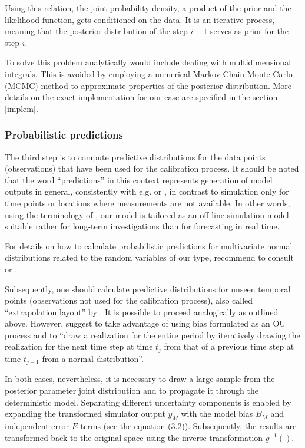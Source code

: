 \documentclass{ctuthesis}\usepackage[]{graphicx}\usepackage[]{color}
\begin{document}
Using this relation, the joint probability density, a product of the prior and the likelihood function, gets conditioned on the data. It is an iterative process, meaning that the posterior distribution of the step $i-1$ serves as prior for the step $i$.

To solve this problem analytically would include dealing with multidimensional integrals. This is avoided by employing a numerical Markov Chain Monte Carlo (MCMC) method to approximate properties of the posterior distribution. More details on the exact implementation for our case are specified in the section \ref{implem}.



\subsubsection{Probabilistic predictions}
The third step is to compute predictive distributions for the data points (observations) that have been used for the calibration process. It should be noted that the word \enquote{predictions} in this context represents  generation of model outputs in general, consistently with e.g. \cite{reichert2012linking} or \cite{giudice2013improving}, in contrast to simulation only for time points or locations where measurements are not available. In other words, using the terminology of \cite{breinholt2012formal}, our model is tailored as an off-line simulation model suitable rather for long-term investigations than for forecasting in  real time.

For details on how to calculate probabilistic predictions for multivariate normal distributions related to the random variables of our type,  \cite{giudice2013improving} recommend to consult \cite{kendall1994vol} or \cite{kollo2006advanced}.

Subsequently, one should calculate predictive distributions for unseen temporal points (observations not used for the calibration process), also called \enquote{extrapolation layout} by \cite{giudice2013improving}. It is possible to proceed analogically as outlined above. However, \cite{giudice2013improving} suggest to take advantage of using bias formulated as an  OU process and to \enquote{draw a realization for the entire period by iteratively drawing the realization for the next time step at time   $t_ j$ from that of a previous time step at time $t_ {j-1}$ from a normal distribution}.

In both cases, nevertheless, it is necessary to draw a large sample from the  posterior parameter joint distribution and to propagate it through the deterministic model. Separating different uncertainty components is enabled by expanding the transformed simulator output $\tilde{y}_M$ with the model bias $B_M$ and independent error $E$ terms (see the equation (3.2)). Subsequently, the results are transformed back to the original space using the inverse transformation $g^{-1}()$.
\end{document}

